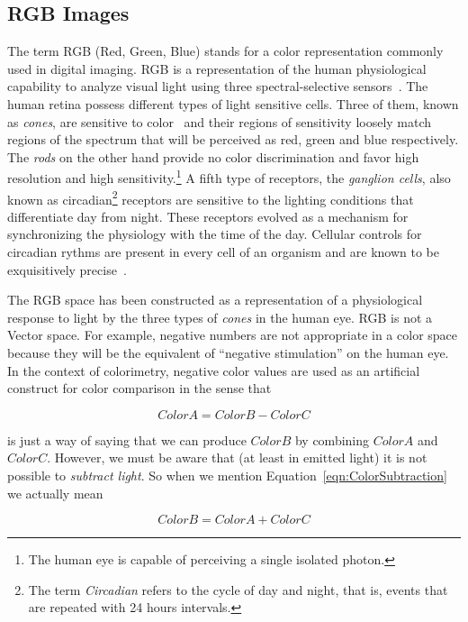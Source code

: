 \subsection{RGB Images}

The term RGB (Red, Green, Blue) stands for a color representation commonly used
in digital imaging. RGB is a representation of the human physiological
capability to analyze visual light using three spectral-selective
sensors~\cite{Malacara2002,Wyszecki2000}. The human retina possess different
types of light sensitive cells. Three of them, known as \emph{cones}, are
sensitive to color~\cite{Gray2003} and their regions of sensitivity loosely
match regions of the spectrum that will be perceived as red, green and blue
respectively. The \emph{rods} on the other hand provide no color discrimination
and favor high resolution and high sensitivity.\footnote{The human eye is
capable of perceiving a single isolated photon.} A fifth type of receptors,
the \emph{ganglion cells}, also known as circadian\footnote{The term
\emph{Circadian} refers to the cycle of day and night, that is, events that are
repeated with 24 hours intervals.} receptors are sensitive to the lighting
conditions that differentiate day from night. These receptors evolved as a
mechanism for synchronizing the physiology with the time of the day. Cellular
controls for circadian rythms are present in every cell of an organism and are
known to be exquisitively precise~\cite{Lodish2000}.

The RGB space has been constructed as a representation of a physiological
response to light by the three types of \emph{cones} in the human eye. RGB is
not a Vector space. For example, negative numbers are not appropriate in a
color space because they will be the equivalent of ``negative stimulation'' on
the human eye. In the context of colorimetry, negative color values are used
as an artificial construct for color comparison in the sense that

\begin{equation}
\label{eqn:ColorSubtraction}
         ColorA = ColorB - ColorC
\end{equation}

is just a way of saying that we can produce $ColorB$ by combining $ColorA$ and
$ColorC$. However, we must be aware that (at least in emitted light) it is not
possible to \emph{subtract light}. So when we mention
Equation~\ref{eqn:ColorSubtraction} we actually mean

\begin{equation}
\label{eqn:ColorAddition}
         ColorB = ColorA + ColorC
\end{equation}

